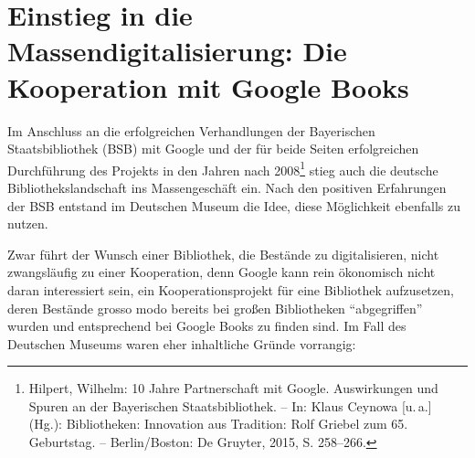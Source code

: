 \documentclass[a4paper,
fontsize=11pt,
oneside,
numbers=noperiodatend,
parskip=half-,
bibliography=totoc,
final
]{scrartcl}
\begin{document}
\hypertarget{einstieg-in-die-massendigitalisierung-die-kooperation-mit-google-books}{%
\section{Einstieg in die Massendigitalisierung: Die Kooperation
mit Google
Books}\label{einstieg-in-die-massendigitalisierung-die-kooperation-mit-google-books}}

Im Anschluss an die erfolgreichen Verhandlungen der Bayerischen
Staatsbibliothek (BSB) mit Google und der für beide Seiten erfolgreichen
Durchführung des Projekts in den Jahren nach 2008\footnote{Hilpert,
  Wilhelm: 10 Jahre Partnerschaft mit Google. Auswirkungen und Spuren an
  der Bayerischen Staatsbibliothek. -- In: Klaus Ceynowa {[}u.\,a.{]}
  (Hg.): Bibliotheken: Innovation aus Tradition: Rolf Griebel zum 65.
  Geburtstag. -- Berlin/Boston: De Gruyter, 2015, S. 258--266.} stieg
auch die deutsche Bibliothekslandschaft ins Massengeschäft ein. Nach den
positiven Erfahrungen der BSB entstand im Deutschen Museum die Idee,
diese Möglichkeit ebenfalls zu nutzen.

Zwar führt der Wunsch einer Bibliothek, die Bestände zu digitalisieren,
nicht zwangsläufig zu einer Kooperation, denn Google kann rein
ökonomisch nicht daran interessiert sein, ein Kooperationsprojekt für
eine Bibliothek aufzusetzen, deren Bestände grosso modo bereits bei
großen Bibliotheken \enquote{abgegriffen} wurden und entsprechend bei
Google Books zu finden sind. Im Fall des Deutschen Museums waren eher
inhaltliche Gründe vorrangig:
\end{document}
